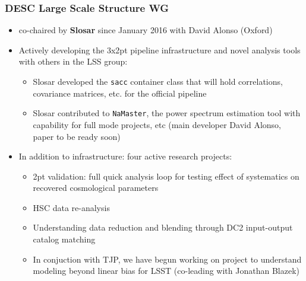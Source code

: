 \documentclass[aspectratio=169]{beamer}
\begin{document}
\begin{frame}
\frametitle {DESC Large Scale Structure WG}

    \begin{itemize}  
        \item co-chaired by \textbf{Slosar} since January 2016 with David
            Alonso (Oxford)

        \item Actively developing the 3x2pt pipeline infrastructure and
            novel analysis tools with others in the LSS group:
            \begin{itemize}
                \item Slosar developed the \texttt{sacc} container class that will
                    hold correlations, covariance matrices, etc. for the official
                    pipeline

                \item Slosar contributed to \texttt{NaMaster}, the power
                    spectrum estimation tool with capability for full mode projects,
                    etc (main developer David Alonso, paper to be ready soon)
            \end{itemize}

        \item In addition to infrastructure: four active research projects:

            \begin{itemize}
                \item 2pt validation: full quick analysis loop for testing effect of 
                    systematics on recovered cosmological parameters

                \item HSC data re-analysis

                \item Understanding data reduction and blending through DC2
                    input-output catalog matching

                \item In conjuction with TJP, we have begun working on project to
                    understand modeling beyond linear bias for LSST (co-leading with
                    Jonathan Blazek)

            \end{itemize}


    \end{itemize}

\end{frame}
\end{document}
